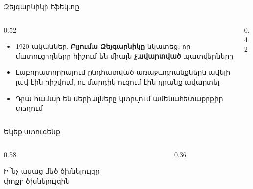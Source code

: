 \begin{frame}{Զեյգարնիկի էֆեկտը}
  \begin{columns}[T]
    \begin{column}{0.52\textwidth}
      \begin{itemize}
        \item 1920-ականներ. \textbf{Բլյումա Զեյգարնիկը} նկատեց, որ մատուցողները հիշում են միայն \textbf{չավարտված} պատվերները
        \item<2-> Լաբորատորիայում ընդհատված առաջադրանքներն ավելի լավ էին հիշվում, ու մարդիկ ուզում էին դրանք ավարտել
        \item<3-> Դրա համար են սերիալները կտրվում ամենահետաքրքիր տեղում
      \end{itemize}
    \end{column}
    \begin{column}{0.42\textwidth}
    \end{column}
  \end{columns}
\end{frame}

\begin{frame}{Եկեք ստուգենք}
  \begin{columns}[c]
    \begin{column}{0.58\textwidth}
      \begin{card}[colback=butter!45!cream]
        \centering
        {\blackfont\large Ի՞նչ ասաց մեծ ծխնելույզը\\ փոքր ծխնելույզին}\par\smallskip
      \end{card}
      \vspace{1mm}
    \end{column}
    \begin{column}{0.36\textwidth}
      \centering
      \par
    \end{column}
  \end{columns}
\end{frame}
